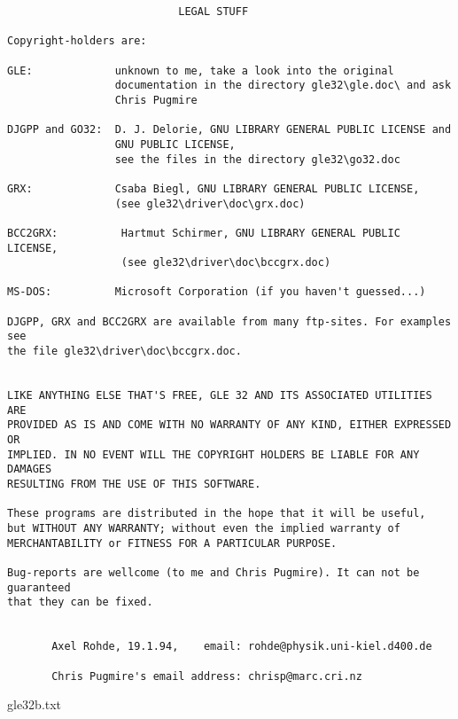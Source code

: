 \begin{center}
\begin{minipage}[t]{11.0cm}
{\scriptsize
\begin{verbatim}
                           LEGAL STUFF

Copyright-holders are:

GLE:             unknown to me, take a look into the original
                 documentation in the directory gle32\gle.doc\ and ask
                 Chris Pugmire

DJGPP and GO32:  D. J. Delorie, GNU LIBRARY GENERAL PUBLIC LICENSE and
                 GNU PUBLIC LICENSE,
                 see the files in the directory gle32\go32.doc

GRX:             Csaba Biegl, GNU LIBRARY GENERAL PUBLIC LICENSE,
                 (see gle32\driver\doc\grx.doc)
		  
BCC2GRX:          Hartmut Schirmer, GNU LIBRARY GENERAL PUBLIC LICENSE,
                  (see gle32\driver\doc\bccgrx.doc)

MS-DOS:          Microsoft Corporation (if you haven't guessed...)

DJGPP, GRX and BCC2GRX are available from many ftp-sites. For examples see
the file gle32\driver\doc\bccgrx.doc.


LIKE ANYTHING ELSE THAT'S FREE, GLE 32 AND ITS ASSOCIATED UTILITIES ARE
PROVIDED AS IS AND COME WITH NO WARRANTY OF ANY KIND, EITHER EXPRESSED OR
IMPLIED. IN NO EVENT WILL THE COPYRIGHT HOLDERS BE LIABLE FOR ANY DAMAGES
RESULTING FROM THE USE OF THIS SOFTWARE.
 
These programs are distributed in the hope that it will be useful,
but WITHOUT ANY WARRANTY; without even the implied warranty of
MERCHANTABILITY or FITNESS FOR A PARTICULAR PURPOSE.

Bug-reports are wellcome (to me and Chris Pugmire). It can not be guaranteed
that they can be fixed.


       Axel Rohde, 19.1.94,    email: rohde@physik.uni-kiel.d400.de

       Chris Pugmire's email address: chrisp@marc.cri.nz 
\end{verbatim}
}
\hfill {\small gle32b.txt}\\
\end{minipage}
\end{center}
